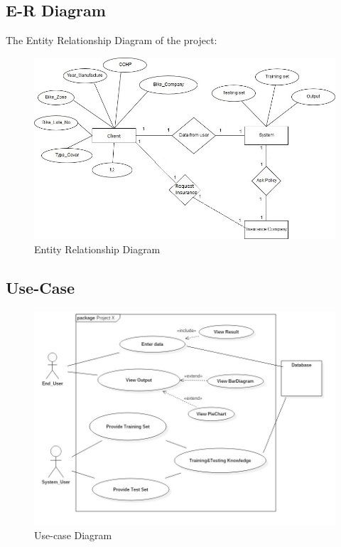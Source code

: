 \subsection{E-R Diagram}
The Entity Relationship Diagram of the project:
\par
\begin{figure}[tbh] %
\begin{large}

	\includegraphics[width=6in]{images/ER.jpg}
	\caption{Entity Relationship Diagram} %
	\label{ER} %
\end{large}
\end{figure}


\newpage




\newpage
\subsection{Use-Case}
\begin{figure}[tbh] %
\begin{center}
	\includegraphics[width = 6in]{images/uc.jpg}
	\caption{Use-case Diagram} %
	\label{Use-case} %
\end{center}
\end{figure}

